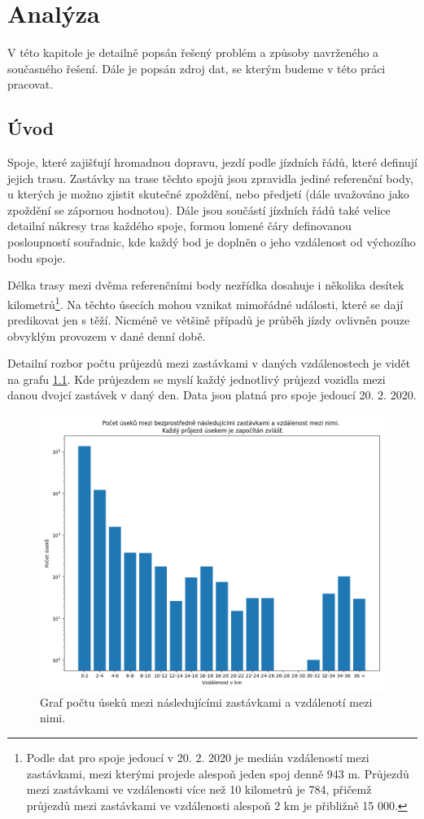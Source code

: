 
\chapter{Analýza}

V této kapitole je detailně popsán řešený problém a způsoby navrženého a současného řešení. Dále je popsán zdroj dat, se kterým budeme v této práci pracovat.

\section{Úvod}

Spoje, které zajišťují hromadnou dopravu, jezdí podle jízdních řádů, které definují jejich trasu. Zastávky na trase těchto spojů jsou zpravidla jediné referenční body, u kterých je možno zjistit skutečné zpoždění, nebo předjetí (dále uvažováno jako zpoždění se zápornou hodnotou). Dále jsou součástí jízdních řádů také velice detailní nákresy tras každého spoje, formou lomené čáry definovanou posloupností souřadnic, kde každý bod je doplněn o jeho vzdálenost od výchozího bodu spoje.

\bigbreak

Délka trasy mezi dvěma referenčními body nezřídka dosahuje i několika desítek kilometrů\footnote{Podle dat pro spoje jedoucí v 20. 2. 2020 je medián vzdáleností mezi zastávkami, mezi kterými projede alespoň jeden spoj denně 943 m. Průjezdů mezi zastávkami ve vzdálenosti více než 10 kilometrů je 784, přičemž průjezdů mezi zastávkami ve vzdálenosti alespoň 2 km je přibližně 15 000.}. Na těchto úsecích mohou vznikat mimořádné události, které se dají predikovat jen s těží. Nicméně ve většině případů je průběh jízdy ovlivněn pouze obvyklým provozem v dané denní době.

\bigbreak

Detailní rozbor počtu průjezdů mezi zastávkami v daných vzdálenostech je vidět na grafu \ref{fig:stop_distances_result}. Kde průjezdem se myslí každý jednotlivý průjezd vozidla mezi danou dvojcí zastávek v daný den. Data jsou platná pro spoje jedoucí 20. 2. 2020.

\begin{figure}
	\centering
  \includegraphics[width=0.6\linewidth]{../img/stop_distances_plot_2020-02-20.png}
  \caption{Graf počtu úseků mezi následujícími zastávkami a vzdálenotí mezi nimi.}
  \label{fig:stop_distances_result}
\end{figure}

